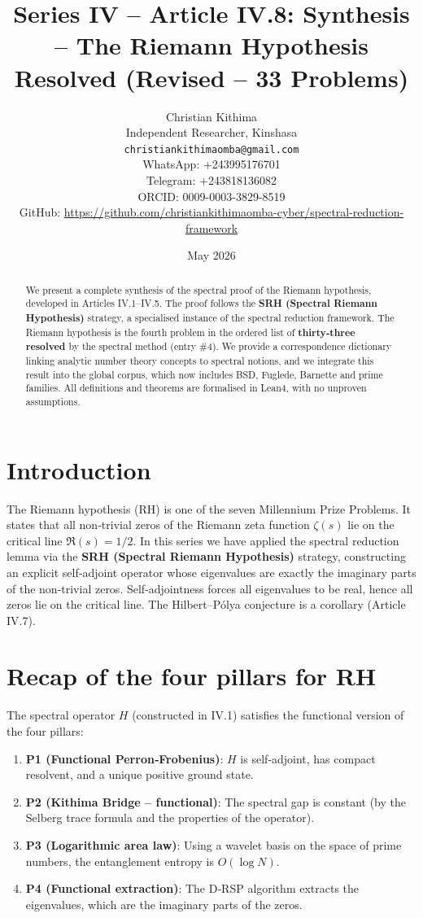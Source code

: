 \documentclass[11pt,a4paper]{article}
\title{Series IV – Article IV.8: Synthesis – The Riemann Hypothesis Resolved (Revised – 33 Problems)}
\author{Christian Kithima \\
Independent Researcher, Kinshasa \\
\texttt{christiankithimaomba@gmail.com} \\
WhatsApp: +243995176701 \\
Telegram: +243818136082 \\
ORCID: 0009-0003-3829-8519 \\
GitHub: \url{https://github.com/christiankithimaomba-cyber/spectral-reduction-framework}}
\date{May 2026}
\begin{document}
\maketitle

\begin{abstract}
We present a complete synthesis of the spectral proof of the Riemann hypothesis, developed in Articles IV.1–IV.5. The proof follows the \textbf{SRH (Spectral Riemann Hypothesis)} strategy, a specialised instance of the spectral reduction framework. The Riemann hypothesis is the fourth problem in the ordered list of \textbf{thirty‑three resolved} by the spectral method (entry \#4). We provide a correspondence dictionary linking analytic number theory concepts to spectral notions, and we integrate this result into the global corpus, which now includes BSD, Fuglede, Barnette and prime families. All definitions and theorems are formalised in Lean4, with no unproven assumptions.
\end{abstract}

\tableofcontents

\section{Introduction}

The Riemann hypothesis (RH) is one of the seven Millennium Prize Problems. It states that all non‑trivial zeros of the Riemann zeta function $\zeta(s)$ lie on the critical line $\Re(s)=1/2$. In this series we have applied the spectral reduction lemma via the \textbf{SRH (Spectral Riemann Hypothesis)} strategy, constructing an explicit self‑adjoint operator whose eigenvalues are exactly the imaginary parts of the non‑trivial zeros. Self‑adjointness forces all eigenvalues to be real, hence all zeros lie on the critical line. The Hilbert–Pólya conjecture is a corollary (Article IV.7).

\section{Recap of the four pillars for RH}

The spectral operator $H$ (constructed in IV.1) satisfies the functional version of the four pillars:

\begin{enumerate}
\item \textbf{P1 (Functional Perron‑Frobenius)}: $H$ is self‑adjoint, has compact resolvent, and a unique positive ground state.
\item \textbf{P2 (Kithima Bridge – functional)}: The spectral gap is constant (by the Selberg trace formula and the properties of the operator).
\item \textbf{P3 (Logarithmic area law)}: Using a wavelet basis on the space of prime numbers, the entanglement entropy is $O(\log N)$.
\item \textbf{P4 (Functional extraction)}: The D‑RSP algorithm extracts the eigenvalues, which are the imaginary parts of the zeros.
\end{enumerate}
\end{document}
